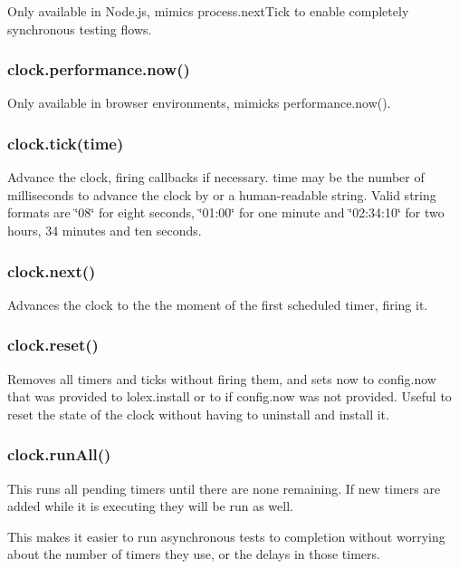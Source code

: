 Only available in Node.\+js, mimics {\ttfamily process.\+next\+Tick} to enable completely synchronous testing flows.

\subsubsection*{{\ttfamily clock.\+performance.\+now()}}

Only available in browser environments, mimicks performance.\+now().

\subsubsection*{{\ttfamily clock.\+tick(time)}}

Advance the clock, firing callbacks if necessary. {\ttfamily time} may be the number of milliseconds to advance the clock by or a human-\/readable string. Valid string formats are {\ttfamily \char`\"{}08\char`\"{}} for eight seconds, {\ttfamily \char`\"{}01\+:00\char`\"{}} for one minute and {\ttfamily \char`\"{}02\+:34\+:10\char`\"{}} for two hours, 34 minutes and ten seconds.

\subsubsection*{{\ttfamily clock.\+next()}}

Advances the clock to the the moment of the first scheduled timer, firing it.

\subsubsection*{{\ttfamily clock.\+reset()}}

Removes all timers and ticks without firing them, and sets {\ttfamily now} to {\ttfamily config.\+now} that was provided to {\ttfamily lolex.\+install} or to {} if {\ttfamily config.\+now} was not provided. Useful to reset the state of the clock without having to {\ttfamily uninstall} and {\ttfamily install} it.

\subsubsection*{{\ttfamily clock.\+run\+All()}}

This runs all pending timers until there are none remaining. If new timers are added while it is executing they will be run as well.

This makes it easier to run asynchronous tests to completion without worrying about the number of timers they use, or the delays in those timers.

